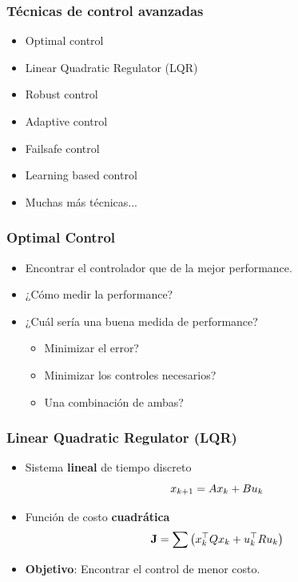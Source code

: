 \begin{frame}
    \frametitle{Técnicas de control avanzadas}
    
    \begin{itemize}
        \item Optimal control
        \item Linear Quadratic Regulator (LQR)
        \item Robust control
        \item Adaptive control
        \item Failsafe control
        \item Learning based control
        \item Muchas más técnicas...
    \end{itemize}
    
\end{frame}

\begin{frame}
    \frametitle{Optimal Control}
    
    \begin{itemize}
        \item Encontrar el controlador que de la mejor performance.
        \item ¿Cómo medir la performance?
        \item ¿Cuál sería una buena medida de performance?
        \begin{itemize}
            \item Minimizar el error?
            \item Minimizar los controles necesarios?
            \item Una combinación de ambas?
        \end{itemize}
    \end{itemize}
    
\end{frame}

\begin{frame}
    \frametitle{Linear Quadratic Regulator (LQR)}
    
    \begin{itemize}
        \item Sistema \textbf{lineal} de tiempo discreto
        \begin{equation*}
            x_{k+1} = A x_{k} + B u_{k}
        \end{equation*}
        \item Función de costo \textbf{cuadrática}
        \begin{equation*}
            \boldsymbol{\mathbf{J}} = \sum{\left(x_{k}^{\top} Q x_{k} + u_{k}^{\top} R u_{k}\right)}
        \end{equation*}
        \item \textbf{Objetivo}: Encontrar el control de menor costo.
    \end{itemize}
    
\end{frame}

